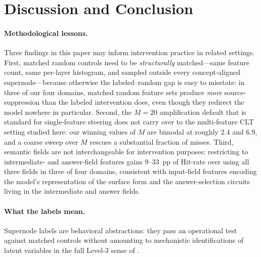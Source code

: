 \section{Discussion and Conclusion}
\label{sec:discussion}

\paragraph{Methodological lessons.}
Three findings in this paper may inform intervention practice in related settings. First, matched random controls need to be \emph{structurally} matched---same feature count, same per-layer histogram, and sampled outside every concept-aligned supernode---because otherwise the labeled--random gap is easy to misstate: in three of our four domains, matched random feature sets produce \emph{more} source-suppression than the labeled intervention does, even though they redirect the model nowhere in particular. Second, the $M{=}20$ amplification default that is standard for single-feature steering does not carry over to the multi-feature CLT setting studied here: our winning values of $M$ are bimodal at roughly $2.4$ and $6.9$, and a coarse sweep over $M$ rescues a substantial fraction of misses. Third, semantic fields are not interchangeable for intervention purposes: restricting to intermediate- and answer-field features gains $9$--$33$~pp of Hit-rate over using all three fields in three of four domains, consistent with input-field features encoding the model's representation of the surface form and the answer-selection circuits living in the intermediate and answer fields.

\paragraph{What the labels mean.}
Supernode labels are behavioral abstractions: they pass an operational test against matched controls without amounting to mechanistic identifications of latent variables in the full Level-3 sense of \citet{geiger2025causal}.

